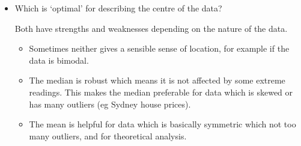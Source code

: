 \documentclass[t,xcolor=pdftex,dvipsnames,table]{beamer}
\makeatletter
\def\maxwidth{ %
  \ifdim\Gin@nat@width>\linewidth
    \linewidth
  \else
    \Gin@nat@width
  \fi
}
\newcommand{\hlnum}[1]{\textcolor[rgb]{0.686,0.059,0.569}{#1}}%
\newcommand{\hlopt}[1]{\textcolor[rgb]{0,0,0}{#1}}%
\newcommand{\hlstd}[1]{\textcolor[rgb]{0.345,0.345,0.345}{#1}}%
\newcommand{\hlkwb}[1]{\textcolor[rgb]{0.69,0.353,0.396}{#1}}%
\newcommand{\hlkwc}[1]{\textcolor[rgb]{0.333,0.667,0.333}{#1}}%
\newcommand{\hlkwd}[1]{\textcolor[rgb]{0.737,0.353,0.396}{\textbf{#1}}}%
\newenvironment{kframe}{%
 \def\at@end@of@kframe{}%
 \ifinner\ifhmode%
  \def\at@end@of@kframe{\end{minipage}}%
  \begin{minipage}{\columnwidth}%
 \fi\fi%
 \def\FrameCommand##1{\hskip\@totalleftmargin \hskip-\fboxsep
 \colorbox{shadecolor}{##1}\hskip-\fboxsep
     \hskip-\linewidth \hskip-\@totalleftmargin \hskip\columnwidth}%
 \MakeFramed {\advance\hsize-\width
   \@totalleftmargin\z@ \linewidth\hsize
   \@setminipage}}%
 {\par\unskip\endMakeFramed%
 \at@end@of@kframe}
\newenvironment{knitrout}{}{} %
\makeatother
\begin{document}
\begin{frame}
\begin{itemize}
\item
Which is ‘optimal’ for describing the centre of the data? 

\vspace{.5cm}
Both have strengths and weaknesses depending on the nature of the data. 
\begin{itemize}
\item Sometimes neither gives a sensible sense of location, for example if the data is bimodal.
\item The median is robust which means it is not affected by some extreme readings. This makes the median preferable for data which is skewed or has many outliers (eg Sydney house prices). 
\item The mean is helpful for data which is basically symmetric which not too many outliers, and for theoretical analysis.
\end{itemize}
\end{itemize}
\end{frame}

\end{document}
